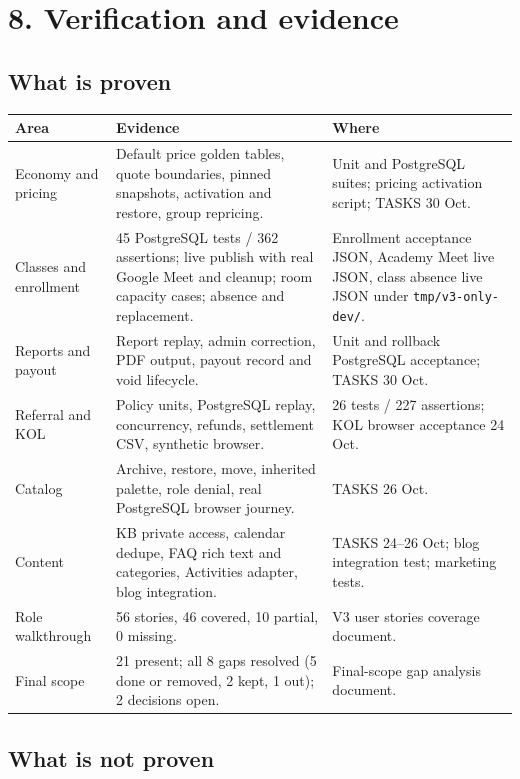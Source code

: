 \documentclass[11pt,a4paper]{article}
\newcommand{\code}[1]{\texttt{#1}}
\begin{document}
\section{8. Verification and evidence}

\subsection{What is proven}

{\footnotesize
\begin{longtable}{@{}L{3.4cm}L{7.4cm}L{4.2cm}@{}}
\toprule
\textbf{Area} & \textbf{Evidence} & \textbf{Where} \\
\midrule
\endhead
Economy and pricing & Default price golden tables, quote boundaries, pinned snapshots, activation and restore, group repricing. & Unit and PostgreSQL suites; pricing activation script; TASKS 30 Oct. \\
Classes and enrollment & 45 PostgreSQL tests / 362 assertions; live publish with real Google Meet and cleanup; room capacity cases; absence and replacement. & Enrollment acceptance JSON, Academy Meet live JSON, class absence live JSON under \code{tmp/v3-only-dev/}. \\
Reports and payout & Report replay, admin correction, PDF output, payout record and void lifecycle. & Unit and rollback PostgreSQL acceptance; TASKS 30 Oct. \\
Referral and KOL & Policy units, PostgreSQL replay, concurrency, refunds, settlement CSV, synthetic browser. & 26 tests / 227 assertions; KOL browser acceptance 24 Oct. \\
Catalog & Archive, restore, move, inherited palette, role denial, real PostgreSQL browser journey. & TASKS 26 Oct. \\
Content & KB private access, calendar dedupe, FAQ rich text and categories, Activities adapter, blog integration. & TASKS 24--26 Oct; blog integration test; marketing tests. \\
Role walkthrough & 56 stories, 46 covered, 10 partial, 0 missing. & V3 user stories coverage document. \\
Final scope & 21 present; all 8 gaps resolved (5 done or removed, 2 kept, 1 out); 2 decisions open. & Final-scope gap analysis document. \\
\bottomrule
\end{longtable}
}

\subsection{What is not proven}
\end{document}
